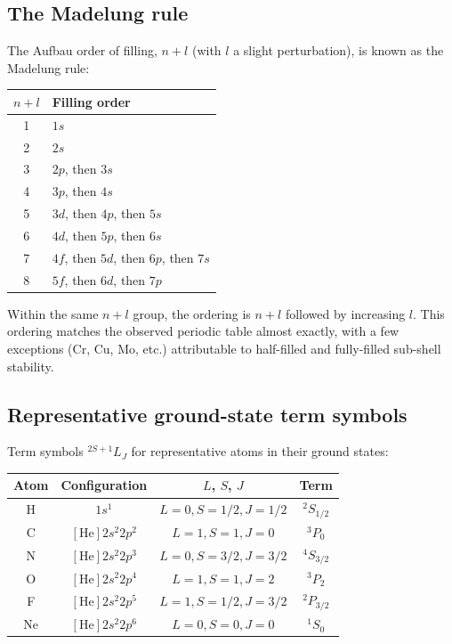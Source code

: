 \subsection{The Madelung rule}

The Aufbau order of filling, $n+l$ (with $l$ a slight perturbation), is known as the Madelung rule:
\begin{center}
\begin{tabular}{c|l}
\toprule
$n+l$ & Filling order \\
\midrule
1 & $1s$ \\
2 & $2s$ \\
3 & $2p$, then $3s$ \\
4 & $3p$, then $4s$ \\
5 & $3d$, then $4p$, then $5s$ \\
6 & $4d$, then $5p$, then $6s$ \\
7 & $4f$, then $5d$, then $6p$, then $7s$ \\
8 & $5f$, then $6d$, then $7p$\\
\bottomrule
\end{tabular}
\end{center}

Within the same $n+l$ group, the ordering is $n+l$ followed by increasing $l$. This ordering matches the observed periodic table almost exactly, with a few exceptions (Cr, Cu, Mo, etc.) attributable to half-filled and fully-filled sub-shell stability.

\subsection{Representative ground-state term symbols}

Term symbols ${}^{2S+1}L_{J}$ for representative atoms in their ground states:
\begin{center}
\begin{tabular}{c|c|c|c}
\toprule
Atom & Configuration & $L$, $S$, $J$ & Term\\
\midrule
H & $1s^{1}$ & $L=0,S=1/2,J=1/2$ & $^{2}S_{1/2}$\\
C & $[\text{He}]2s^{2}2p^{2}$ & $L=1,S=1,J=0$ & $^{3}P_{0}$\\
N & $[\text{He}]2s^{2}2p^{3}$ & $L=0,S=3/2,J=3/2$ & $^{4}S_{3/2}$\\
O & $[\text{He}]2s^{2}2p^{4}$ & $L=1,S=1,J=2$ & $^{3}P_{2}$\\
F & $[\text{He}]2s^{2}2p^{5}$ & $L=1,S=1/2,J=3/2$ & $^{2}P_{3/2}$\\
Ne & $[\text{He}]2s^{2}2p^{6}$ & $L=0,S=0,J=0$ & $^{1}S_{0}$\\
\bottomrule
\end{tabular}
\end{center}

